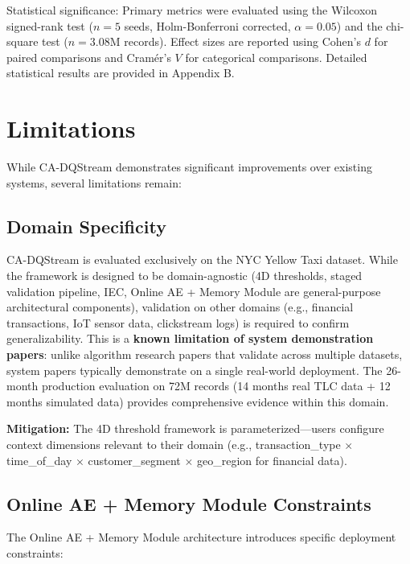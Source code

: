 Statistical significance: Primary metrics were evaluated using the Wilcoxon signed-rank test ($n=5$ seeds, Holm-Bonferroni corrected, $\alpha=0.05$) and the chi-square test ($n=3.08$M records). Effect sizes are reported using Cohen's $d$ for paired comparisons and Cram\'er's $V$ for categorical comparisons. Detailed statistical results are provided in Appendix B.

\section{Limitations}

While CA-DQStream demonstrates significant improvements over existing systems, several limitations remain:

\subsection{Domain Specificity}

CA-DQStream is evaluated exclusively on the NYC Yellow Taxi dataset. While the framework is designed to be domain-agnostic (4D thresholds, staged validation pipeline, IEC, Online AE + Memory Module are general-purpose architectural components), validation on other domains (e.g., financial transactions, IoT sensor data, clickstream logs) is required to confirm generalizability. This is a \textbf{known limitation of system demonstration papers}: unlike algorithm research papers that validate across multiple datasets, system papers typically demonstrate on a single real-world deployment. The 26-month production evaluation on 72M records (14 months real TLC data + 12 months simulated data) provides comprehensive evidence within this domain.

\textbf{Mitigation:} The 4D threshold framework is parameterized---users configure context dimensions relevant to their domain (e.g., transaction\_type $\times$ time\_of\_day $\times$ customer\_segment $\times$ geo\_region for financial data).

\subsection{Online AE + Memory Module Constraints}

The Online AE + Memory Module architecture introduces specific deployment constraints:

